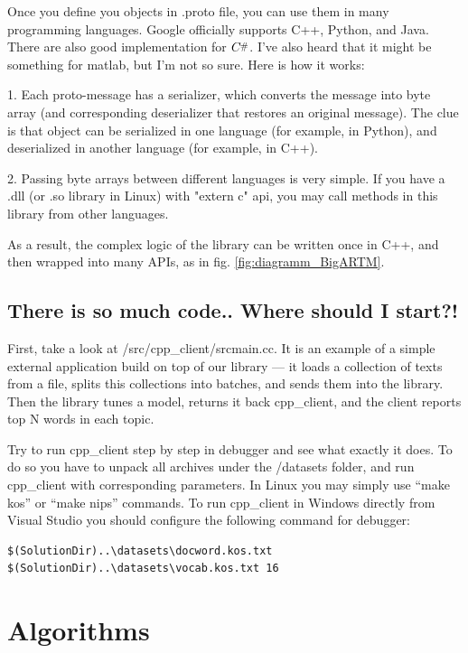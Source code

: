\documentclass[11pt,a4paper,twoside]{report}
\newcommand{\Csharp}{%
  {\settoheight{\dimen0}{C}C\kern-.05em \resizebox{!}{\dimen0}{\raisebox{\depth}{\#}}}}
\begin{document}
Once you define you objects in .proto file, you can use them in many programming languages.
Google officially supports C++, Python, and Java. There are also good implementation for $\Csharp$.
I've also heard that it might be something for matlab, but I'm not so sure. Here is how it works:

1. Each proto-message has a serializer, which converts the message into byte array
(and corresponding deserializer that restores an original message).
The clue is that object can be serialized in one language (for example, in Python),
and deserialized in another language (for example, in C++).

2. Passing byte arrays between different languages is very simple.
If you have a .dll (or .so library in Linux) with "extern c" api,
you may call methods in this library from other languages.

As a result, the complex logic of the library can be written once in C++,
and then wrapped into many APIs, as in fig. \ref{fig:diagramm_BigARTM}.

\subsection{There is so much code.. Where should I start?!}

First, take a look at /src/cpp\_client/srcmain.cc.
It is an example of a simple external application build on top of our library ---
it loads a collection of texts from a file,
splits this collections into batches, and sends them into the library.
Then the library tunes a model,
returns it back cpp\_client,
and the client reports top N words in each topic.

Try to run cpp\_client step by step in debugger and see what exactly it does.
To do so you have to unpack all archives under the /datasets folder,
and run cpp\_client with corresponding parameters.
In Linux you may simply use ``make kos'' or ``make nips'' commands.
To run cpp\_client in Windows directly from Visual Studio
you should configure the following command for debugger:

{\small
\begin{verbatim}
$(SolutionDir)..\datasets\docword.kos.txt $(SolutionDir)..\datasets\vocab.kos.txt 16
\end{verbatim}}

\section{Algorithms}
\end{document}
